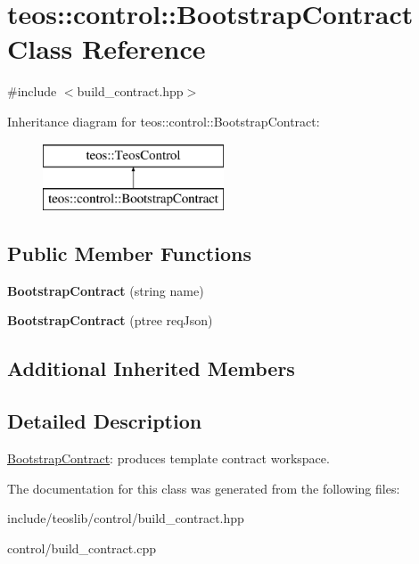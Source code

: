 \hypertarget{classteos_1_1control_1_1_bootstrap_contract}{}\section{teos\+:\+:control\+:\+:Bootstrap\+Contract Class Reference}
\label{classteos_1_1control_1_1_bootstrap_contract}


{\ttfamily \#include $<$build\+\_\+contract.\+hpp$>$}

Inheritance diagram for teos\+:\+:control\+:\+:Bootstrap\+Contract\+:\begin{figure}[H]
\begin{center}
\leavevmode
\includegraphics[height=2.000000cm]{classteos_1_1control_1_1_bootstrap_contract}
\end{center}
\end{figure}
\subsection*{Public Member Functions}
\begin{DoxyCompactItemize}
\item 
\mbox{\label{classteos_1_1control_1_1_bootstrap_contract_a43979b7c9daa4406a374c18431e28407}} 
{\bfseries Bootstrap\+Contract} (string name)
\item 
\mbox{\label{classteos_1_1control_1_1_bootstrap_contract_ab7cbf4e4afab0d22739fbff222c1bd9e}} 
{\bfseries Bootstrap\+Contract} (ptree req\+Json)
\end{DoxyCompactItemize}
\subsection*{Additional Inherited Members}


\subsection{Detailed Description}
\mbox{\hyperlink{classteos_1_1control_1_1_bootstrap_contract}{Bootstrap\+Contract}}\+: produces template contract workspace. 

The documentation for this class was generated from the following files\+:\begin{DoxyCompactItemize}
\item 
include/teoslib/control/build\+\_\+contract.\+hpp\item 
control/build\+\_\+contract.\+cpp\end{DoxyCompactItemize}
